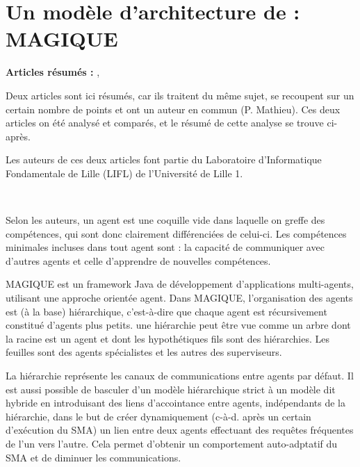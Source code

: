 \section{Un modèle d'architecture de  : MAGIQUE}
\textbf{Articles résumés :} \cite{m1}, \cite{m2}

Deux articles sont ici résumés, car ils traitent du même sujet, se recoupent sur un certain nombre de points et ont un auteur en commun (P. Mathieu). Ces deux articles on été analysé et comparés, et le résumé de cette analyse se trouve ci-après.



Les auteurs de ces deux articles font partie du Laboratoire d'Informatique Fondamentale de Lille (LIFL) de l'Université de Lille 1.

~

Selon les auteurs, un agent est une \og{}coquille vide\fg{} dans laquelle on greffe des compétences, qui sont donc clairement différenciées de celui-ci. Les compétences minimales incluses dans tout agent sont : la capacité de communiquer avec d'autres agents et celle d'apprendre de nouvelles compétences.

MAGIQUE est un framework Java de développement d'applications multi-agents, utilisant une approche \og{}orientée agent\fg{}. Dans MAGIQUE, l'organisation des agents est (à la base) hiérarchique, c'est-à-dire que chaque agent est récursivement constitué d'agents plus petits. une hiérarchie peut être vue comme un arbre dont la racine est un agent et dont les hypothétiques fils sont des hiérarchies. Les feuilles sont des agents spécialistes et les autres des superviseurs.

La hiérarchie représente les canaux de communications entre agents par défaut. Il est aussi possible de basculer d'un modèle hiérarchique strict à un modèle dit \og{}hybride\fg{} en introduisant des liens d'\og{}accointance\fg{} entre agents, indépendants de la hiérarchie, dans le but de créer dynamiquement (c-à-d. après un certain d'exécution du SMA) un lien entre deux agents effectuant des requêtes fréquentes de l'un vers l'autre. Cela permet d'obtenir un comportement auto-adptatif du SMA et de diminuer les communications.


